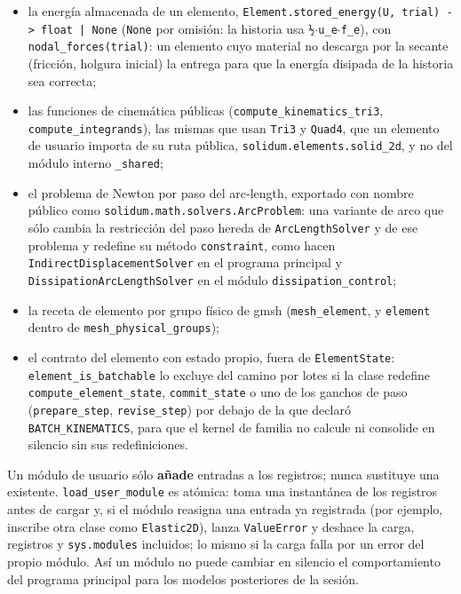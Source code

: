 \documentclass[11pt,oneside]{report}
\begin{document}
\begin{itemize}
  \item la energía almacenada de un elemento, \texttt{Element.\allowbreak{}stored\_\allowbreak{}energy(U, trial) -\textgreater{} float | None} (\texttt{None} por omisión: la historia usa \texttt{½\ensuremath{\cdot}u\_e\ensuremath{\cdot}f\_e}), con \texttt{nodal\_\allowbreak{}forces(trial)}: un elemento cuyo material no descarga por la secante (fricción, holgura inicial) la entrega para que la energía disipada de la historia sea correcta;
  \item las funciones de cinemática públicas (\texttt{compute\_\allowbreak{}kinematics\_\allowbreak{}tri3}, \texttt{compute\_\allowbreak{}integrands}), las mismas que usan \texttt{Tri3} y \texttt{Quad4}, que un elemento de usuario importa de su ruta pública, \texttt{solidum.\allowbreak{}elements.\allowbreak{}solid\_\allowbreak{}2d}, y no del módulo interno \texttt{\_shared};
  \item el problema de Newton por paso del arc-length, exportado con nombre público como \texttt{solidum.\allowbreak{}math.\allowbreak{}solvers.\allowbreak{}ArcProblem}: una variante de arco que sólo cambia la restricción del paso hereda de \texttt{ArcLengthSolver} y de ese problema y redefine su método \texttt{constraint}, como hacen \texttt{IndirectDisplacementSolver} en el programa principal y \texttt{DissipationArcLengthSolver} en el módulo \texttt{dissipation\_\allowbreak{}control};
  \item la receta de elemento por grupo físico de gmsh (\texttt{mesh\_element}, y \texttt{element} dentro de \texttt{mesh\_\allowbreak{}physical\_\allowbreak{}groups});
  \item el contrato del elemento con estado propio, fuera de \texttt{ElementState}: \texttt{element\_\allowbreak{}is\_\allowbreak{}batchable} lo excluye del camino por lotes si la clase redefine \texttt{compute\_\allowbreak{}element\_\allowbreak{}state}, \texttt{commit\_state} o uno de los ganchos de paso (\texttt{prepare\_step}, \texttt{revise\_step}) por debajo de la que declaró \texttt{BATCH\_KINEMATICS}, para que el kernel de familia no calcule ni consolide en silencio sin sus redefiniciones.
\end{itemize}

Un módulo de usuario sólo \textbf{añade} entradas a los registros; nunca sustituye una existente. \texttt{load\_user\_module} es atómica: toma una instantánea de los registros antes de cargar y, si el módulo reasigna una entrada ya registrada (por ejemplo, inscribe otra clase como \texttt{Elastic2D}), lanza \texttt{ValueError} y deshace la carga, registros y \texttt{sys.modules} incluidos; lo mismo si la carga falla por un error del propio módulo. Así un módulo no puede cambiar en silencio el comportamiento del programa principal para los modelos posteriores de la sesión.
\end{document}
